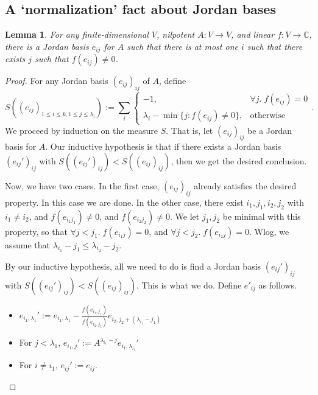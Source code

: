 \documentclass[12pt,psamsfonts]{article}
\newtheorem{lemma}[theorem]{Lemma}
\begin{document}
\subsection{A `normalization' fact about Jordan bases}
\begin{lemma}\label{normalization_helper_one}
    For any finite-dimensional \(V\), nilpotent \(A : V \to V\), and linear \(f : V \to \mathbb{C}\), there is a Jordan basis \(e_{ij}\) for \(A\) such that there is at most one \(i\) such that there exists \(j\) such that \(f(e_{ij}) \neq 0\).
\end{lemma}
\begin{proof}
    For any Jordan basis \((e_{ij})_{ij}\) of \(A\), define
    \[S((e_{ij})_{1 \leq i \leq k, 1 \leq j \leq \lambda_i}) := \sum_i \begin{cases}-1, & \forall j. \; f (e_{ij}) = 0 \\ \lambda_i - \min\{j : f (e_{ij}) \neq 0\}, & \textrm{otherwise} \end{cases}.\]
    We proceed by induction on the measure \(S\).
    That is, let \((e_{ij})_{ij}\) be a Jordan basis for \(A\).
    Our inductive hypothesis is that if there exists a Jordan basis \((e_{ij}')_{ij}\) with \(S((e_{ij}')_{ij}) < S((e_{ij})_{ij})\), then we get the desired conclusion.
    \par Now, we have two cases.
    In the first case, \((e_{ij})_{ij}\) already satisfies the desired property.
    In this case we are done.
    In the other case, there exist \(i_1, j_1, i_2, j_2\) with \(i_1 \neq i_2\), and \(f(e_{i_1j_1}) \neq 0\), and \(f(e_{i_2j_2}) \neq 0\).
    We let \(j_1, j_2\) be minimal with this property, so that \(\forall j < j_1. \; f(e_{i_1j}) = 0\), and \(\forall j < j_2. \; f(e_{i_2j}) = 0\).
    Wlog, we assume that \(\lambda_{i_1} - j_1 \leq \lambda_{i_2} - j_2\).
    \par By our inductive hypothesis, all we need to do is find a Jordan basis \((e_{ij}')_{ij}\) with \(S((e_{ij}')_{ij}) < S((e_{ij})_{ij})\).
    This is what we do.
    Define \(e'_{ij}\) as follows.
    \begin{itemize}
        \item \(e_{i_1, \lambda_1}' := e_{i_1, \lambda_1} - \frac{f(e_{i_1, j_1})}{f(e_{i_2, j_2})}e_{i_2, j_2 + (\lambda_{i_1} - j_1)}\)
        \item For \(j < \lambda_1\), \(e_{i_1, j}' := A^{\lambda_{i_1} - j} e_{i_1, \lambda_{i_1}}'\)
        \item For \(i \neq i_1\), \(e_{ij}' := e_{ij}\).
    \end{itemize}

\end{proof}
\end{document}
